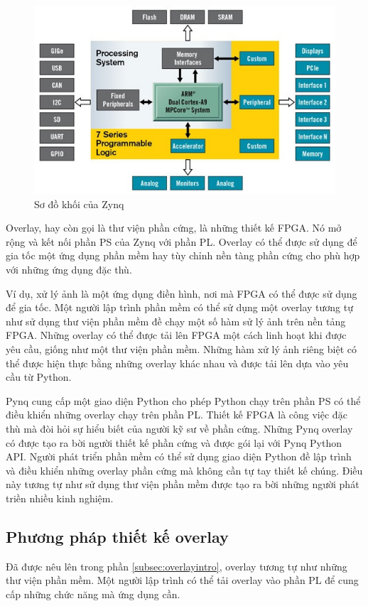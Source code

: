         \begin{figure}[htp]
    		\centering
     		\includegraphics[scale=1]{images/zynq_block_diagram.jpg}
    		\caption{Sơ đồ khối của Zynq}
    		\label{fig:zynqblockdiagram}
    	\end{figure}

		Overlay, hay còn gọi là thư viện phần cứng, là những thiết kế FPGA. Nó mở rộng và kết nối phần PS của Zynq với phần PL. Overlay có thể được sử dụng để gia tốc một ứng dụng phần mềm hay tùy chỉnh nền tàng phần cứng cho phù hợp với những ứng dụng đặc thù.

		Ví dụ, xử lý ảnh là một ứng dụng điền hình, nơi mà FPGA có thể được sử dụng để gia tốc. Một người lập trình phần mềm có thể sử dụng một overlay tương tự như sử dụng thư viện phần mềm đề chạy một số hàm sử lý ảnh trên nền tảng FPGA. Những overlay có thể được tải lên FPGA một cách linh hoạt khi được yêu cầu, giống như một thư viện phần mềm. Những hàm xử lý ảnh riêng biệt có thể được hiện thực bằng những overlay khác nhau và được tải lên dựa vào yêu cầu từ Python.

		Pynq cung cấp một giao diện Python cho phép Python chạy trên phần PS có thể điều khiển những overlay chạy trên phần PL. Thiết kế FPGA là công việc đặc thù mà đòi hỏi sự hiểu biết của người kỹ sư về phần cứng. Những Pynq overlay có được tạo ra bời người thiết kế phần cứng và được gói lại với Pynq Python API. Người phát triển phần mềm có thể sử dụng giao diện Python đề lập trình và điều khiển những overlay phần cứng mà không cần tự tay thiết kế chúng. Điều này tương tự như sử dụng thư viện phần mềm được tạo ra bời những người phát triền nhiều kinh nghiệm.

		\subsection{Phương pháp thiết kế overlay}
		Đã được nêu lên trong phần \ref{subsec:overlayintro}, overlay tương tự như những thư viện phần mềm. Một người lập trình có thể tải overlay vào phần PL để cung cấp những chức năng mà ứng dụng cần.

